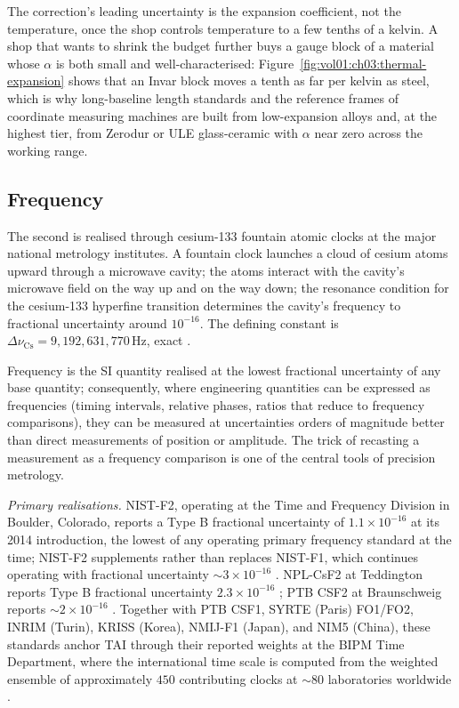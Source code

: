 The correction's leading uncertainty is the expansion coefficient,
not the temperature, once the shop controls temperature to a few
tenths of a kelvin. A shop that wants to shrink the budget further
buys a gauge block of a material whose $\alpha$ is both small and
well-characterised: Figure~\ref{fig:vol01:ch03:thermal-expansion}
shows that an Invar block moves a tenth as far per kelvin as steel,
which is why long-baseline length standards and the reference frames
of coordinate measuring machines are built from low-expansion alloys
and, at the highest tier, from Zerodur or ULE glass-ceramic with
$\alpha$ near zero across the working range.

\subsection{Frequency}

The second is realised through cesium-133 fountain atomic clocks at
the major national metrology institutes. A fountain clock launches
a cloud of cesium atoms upward through a microwave cavity; the
atoms interact with the cavity's microwave field on the way up and
on the way down; the resonance condition for the cesium-133
hyperfine transition determines the cavity's frequency to fractional
uncertainty around $10^{-16}$. The defining constant is
$\Delta\nu_{\text{Cs}} = 9{,}192{,}631{,}770 \,\si{\hertz}$, exact
\cite{std:bipm-si2019}.

Frequency is the SI quantity realised at the lowest fractional
uncertainty of any base quantity; consequently, where engineering
quantities can be expressed as frequencies (timing intervals,
relative phases, ratios that reduce to frequency comparisons), they
can be measured at uncertainties orders of magnitude better than
direct measurements of position or amplitude. The trick of recasting
a measurement as a frequency comparison is one of the central tools
of precision metrology.

\textit{Primary realisations.} NIST-F2, operating at the Time and
Frequency Division in Boulder, Colorado, reports a Type B
fractional uncertainty of $1.1 \times 10^{-16}$ at its 2014
introduction, the lowest of any operating primary frequency
standard at the time; NIST-F2 supplements rather than replaces
NIST-F1, which continues operating with fractional uncertainty
$\sim 3 \times 10^{-16}$ \cite{web:ch03t3-nist-cesium-fountain-f2}.
NPL-CsF2 at Teddington reports Type B fractional uncertainty
$2.3 \times 10^{-16}$ \cite{web:ch03t3-npl-csf2-fountain}; PTB
CSF2 at Braunschweig reports $\sim 2 \times 10^{-16}$
\cite{web:ch03t3-ptb-csf2-fountain}. Together with PTB CSF1, SYRTE
(Paris) FO1/FO2, INRIM (Turin), KRISS (Korea), NMIJ-F1 (Japan),
and NIM5 (China), these standards anchor TAI through their reported
weights at the BIPM Time Department, where the international time
scale is computed from the weighted ensemble of approximately $450$
contributing clocks at $\sim 80$ laboratories worldwide
\cite{web:ch03t3-bipm-tai}.

